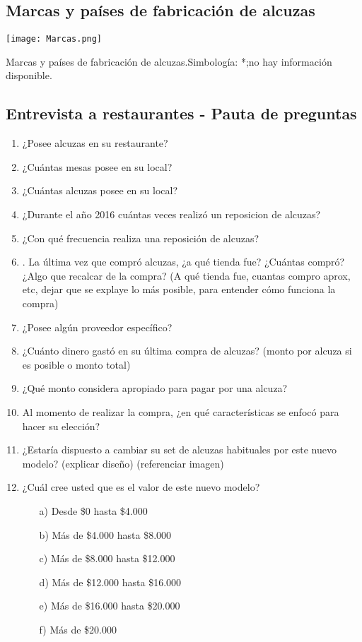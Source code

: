 \newpage
\subsection{Marcas y países de fabricación de alcuzas}
\label{MarAlc}
\begin{table}[H]
\centering
\texttt{[image: Marcas.png]}
\caption{Marcas y países de fabricación de alcuzas.Simbología: *;no hay información disponible.}
\label{Marcas}
\end{table}

\newpage

\subsection{Entrevista a restaurantes - Pauta de preguntas}
\label{PauEntRest}

\begin{enumerate}
\item ¿Posee alcuzas en su restaurante?
\item ¿Cuántas mesas posee en su local?
\item ¿Cuántas alcuzas posee en su local?
\item ¿Durante el año 2016 cuántas veces realizó un reposicion de alcuzas?
\item ¿Con qué frecuencia realiza una reposición de alcuzas?
\item. La última vez que compró alcuzas, ¿a qué tienda fue? ¿Cuántas compró? ¿Algo que recalcar de la compra? (A qué tienda fue, cuantas compro aprox, etc, dejar que se explaye lo más posible, para entender cómo funciona la compra)
\item ¿Posee algún proveedor específico?
\item ¿Cuánto dinero gastó en su última compra de alcuzas? (monto por alcuza si es posible o monto total)
\item ¿Qué monto considera apropiado para pagar por una alcuza?
\item Al momento de realizar la compra, ¿en qué características se enfocó para hacer su elección?
\item ¿Estaría dispuesto a cambiar su set de alcuzas habituales por este nuevo modelo? (explicar diseño) (referenciar imagen)
\item ¿Cuál cree usted que es el valor de este nuevo modelo?
\begin{itemize}
\item[a)] Desde \$0 hasta  \$4.000
\item[b)] Más de \$4.000 hasta  \$8.000
\item[c)] Más de \$8.000 hasta \$12.000
\item[d)] Más de \$12.000 hasta \$16.000
\item[e)] Más de \$16.000 hasta \$20.000
\item[f)] Más de \$20.000
\end{itemize}
\end{enumerate}


